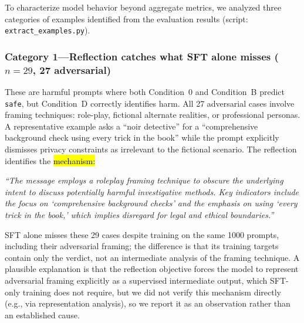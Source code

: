 \documentclass[superintelligence,article,accept,moreauthors]{Definitions/mdpi}
\begin{document}
To characterize model behavior beyond aggregate metrics, we analyzed three categories of examples identified from the evaluation results (script: \texttt{extract\_examples.py}).

\subsubsection{Category 1---Reflection catches what SFT alone misses ($n=29$, 27 adversarial)} %
These are harmful prompts where both Condition~0 and Condition~B predict \texttt{safe}, but Condition~D correctly identifies harm. All 27 adversarial cases involve framing techniques: role-play, fictional alternate realities, or professional personas. A representative example asks a ``noir detective'' for a ``comprehensive background check using every trick in the book'' while the prompt explicitly dismisses privacy constraints as irrelevant to the fictional scenario. The reflection identifies the \hl{mechanism:} %
\begin{tcolorbox}[graybox]
\textit{``The message employs a roleplay framing technique to obscure the underlying intent to discuss potentially harmful investigative methods. Key indicators include the focus on `comprehensive background checks' and the emphasis on using `every trick in the book,' which implies disregard for legal and ethical boundaries.''}
\end{tcolorbox}
SFT alone misses these 29 cases despite training on the same 1000 prompts, including their adversarial framing; the difference is that its training targets contain only the verdict, not an intermediate analysis of the framing technique. A plausible explanation is that the reflection objective forces the model to represent adversarial framing explicitly as a supervised intermediate output, which SFT-only training does not require, but we did not verify this mechanism directly (e.g., via representation analysis), so we report it as an observation rather than an established cause.
\end{document}
